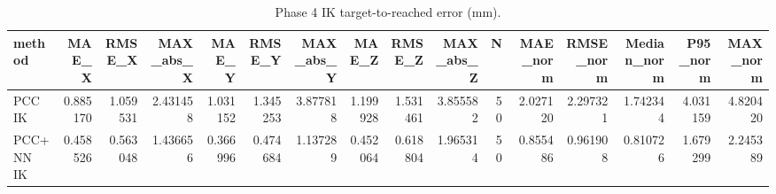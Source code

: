 \begin{table}
\caption{Phase 4 IK target-to-reached error (mm).}
\label{tab:phase4_extended}
\begin{tabular}{lrrrrrrrrrrrrrrr}
\toprule
method & MAE_X & RMSE_X & MAX_abs_X & MAE_Y & RMSE_Y & MAX_abs_Y & MAE_Z & RMSE_Z & MAX_abs_Z & N & MAE_norm & RMSE_norm & Median_norm & P95_norm & MAX_norm \\
\midrule
PCC IK & 0.885170 & 1.059531 & 2.431458 & 1.031152 & 1.345253 & 3.877818 & 1.199928 & 1.531461 & 3.855582 & 50 & 2.027120 & 2.297321 & 1.742344 & 4.031159 & 4.820420 \\
PCC+NN IK & 0.458526 & 0.563048 & 1.436656 & 0.366996 & 0.474684 & 1.137289 & 0.452064 & 0.618804 & 1.965314 & 50 & 0.855486 & 0.961908 & 0.810726 & 1.679299 & 2.245389 \\
\bottomrule
\end{tabular}
\end{table}
